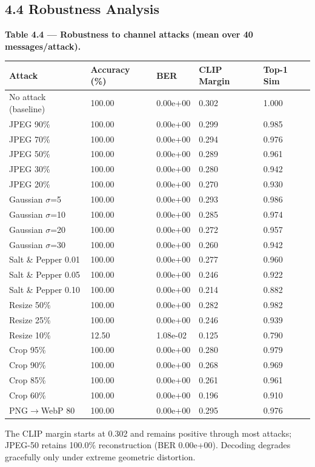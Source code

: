 \documentclass[11pt]{article}
\begin{document}
\subsection*{4.4 Robustness Analysis}
\textbf{Table 4.4 --- Robustness to channel attacks (mean over 40 messages/attack).}
\begin{table}[H]\centering\small
\begin{tabularx}{\textwidth}{lXXXX}
\toprule
Attack & Accuracy (\%) & BER & CLIP Margin & Top-1 Sim \\
\midrule
No attack (baseline) & 100.00 & 0.00e+00 & 0.302 & 1.000 \\
JPEG 90\% & 100.00 & 0.00e+00 & 0.299 & 0.985 \\
JPEG 70\% & 100.00 & 0.00e+00 & 0.294 & 0.976 \\
JPEG 50\% & 100.00 & 0.00e+00 & 0.289 & 0.961 \\
JPEG 30\% & 100.00 & 0.00e+00 & 0.280 & 0.942 \\
JPEG 20\% & 100.00 & 0.00e+00 & 0.270 & 0.930 \\
Gaussian $\sigma$=5 & 100.00 & 0.00e+00 & 0.293 & 0.986 \\
Gaussian $\sigma$=10 & 100.00 & 0.00e+00 & 0.285 & 0.974 \\
Gaussian $\sigma$=20 & 100.00 & 0.00e+00 & 0.272 & 0.957 \\
Gaussian $\sigma$=30 & 100.00 & 0.00e+00 & 0.260 & 0.942 \\
Salt \& Pepper 0.01 & 100.00 & 0.00e+00 & 0.277 & 0.960 \\
Salt \& Pepper 0.05 & 100.00 & 0.00e+00 & 0.246 & 0.922 \\
Salt \& Pepper 0.10 & 100.00 & 0.00e+00 & 0.214 & 0.882 \\
Resize 50\% & 100.00 & 0.00e+00 & 0.282 & 0.982 \\
Resize 25\% & 100.00 & 0.00e+00 & 0.246 & 0.939 \\
Resize 10\% & 12.50 & 1.08e-02 & 0.125 & 0.790 \\
Crop 95\% & 100.00 & 0.00e+00 & 0.280 & 0.979 \\
Crop 90\% & 100.00 & 0.00e+00 & 0.268 & 0.969 \\
Crop 85\% & 100.00 & 0.00e+00 & 0.261 & 0.961 \\
Crop 60\% & 100.00 & 0.00e+00 & 0.196 & 0.910 \\
PNG$\to$WebP 80 & 100.00 & 0.00e+00 & 0.295 & 0.976 \\
\bottomrule
\end{tabularx}
\end{table}
The CLIP margin starts at 0.302 and remains positive through most attacks; JPEG-50 retains 100.0\% reconstruction (BER 0.00e+00). Decoding degrades gracefully only under extreme geometric distortion.
\end{document}
